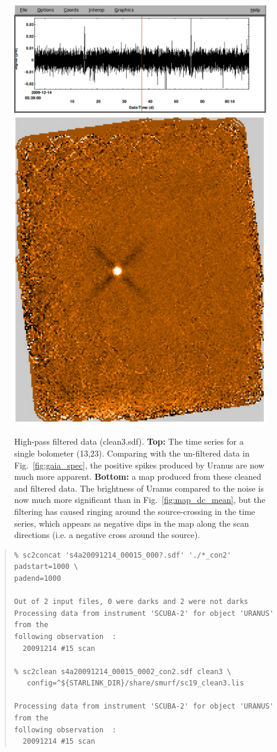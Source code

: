 \documentclass[twoside,11pt]{article}
\renewcommand{\_}{\texttt{\symbol{95}}}
\newenvironment{myquote}{\begin{quote}\begin{small}}{\end{small}\end{quote}}
\begin{document}
\begin{figure}
\begin{center}
\includegraphics[width=\linewidth]{sc19_spec_filt} \\
\vspace{0.3in}
\includegraphics[width=0.5\linewidth]{sc19_map_highpass}
\caption{High-pass filtered data (clean3.sdf). {\bf Top:} The time
  series for a single bolometer (13,23). Comparing with the un-filtered
  data in Fig.~\ref{fig:gaia_spec}, the positive spikes produced by
  Uranus are now much more apparent. {\bf Bottom:} a map produced from
  these cleaned and filtered data. The brightness of Uranus compared
  to the noise is now much more significant than in
  Fig.~\ref{fig:map_dc_mean}, but the filtering has caused ringing
  around the source-crossing in the time series, which appears as
  negative dips in the map along the scan directions (i.e. a negative
  cross around the source).}
\label{fig:highpass}
\end{center}
\end{figure}

\begin{myquote}
\begin{verbatim}
% sc2concat 's4a20091214_00015_000?.sdf' './*_con2' padstart=1000 \
padend=1000

Out of 2 input files, 0 were darks and 2 were not darks
Processing data from instrument 'SCUBA-2' for object 'URANUS' from the
following observation  :
  20091214 #15 scan

% sc2clean s4a20091214_00015_0002_con2.sdf clean3 \
   config=^${STARLINK_DIR}/share/smurf/sc19_clean3.lis

Processing data from instrument 'SCUBA-2' for object 'URANUS' from the
following observation  :
  20091214 #15 scan

\end{verbatim}
\end{myquote}
\end{document}
